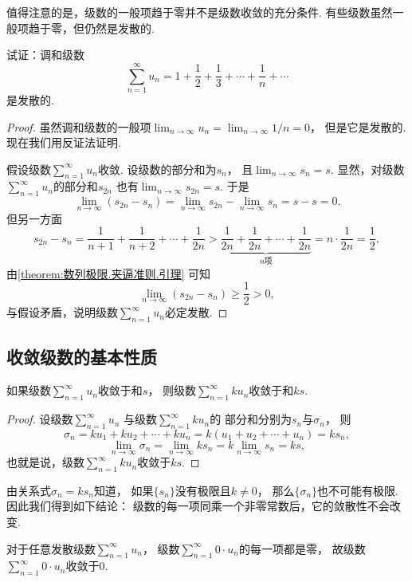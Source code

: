 值得注意的是，级数的一般项趋于零并不是级数收敛的充分条件.
有些级数虽然一般项趋于零，但仍然是发散的.
\begin{example}\label{example:无穷级数.调和级数的敛散性}
试证：调和级数\[
	\sum_{n=1}^\infty u_n
	= 1+\frac12+\frac13+\dotsb+\frac1n+\dotsb
\]是发散的.
\begin{proof}
虽然调和级数的一般项\(\lim_{n\to\infty} u_n
= \lim_{n\to\infty} 1/n
= 0\)，
但是它是发散的.
现在我们用反证法证明.

假设级数\(\sum_{n=1}^\infty u_n\)收敛.
设级数的部分和为\(s_n\)，
且\(\lim_{n\to\infty} s_n
= s\).
显然，对级数\(\sum_{n=1}^\infty u_n\)的部分和\(s_{2n}\)
也有\(\lim_{n\to\infty} s_{2n}
= s\).
于是\[
	\lim_{n\to\infty} (s_{2n}-s_n)
	= \lim_{n\to\infty} s_{2n} - \lim_{n\to\infty} s_n
	= s - s
	= 0.
\]
但另一方面\[
	s_{2n} - s_n
	= \frac{1}{n+1}+\frac{1}{n+2}+\dotsb+\frac{1}{2n}
	> \underbrace{\frac{1}{2n}+\frac{1}{2n}+\dotsb+\frac{1}{2n}}_{n\text{项}}
	= n \cdot \frac1{2n}
	= \frac12,
\]
由\cref{theorem:数列极限.夹逼准则.引理} 可知\[
	\lim_{n\to\infty} (s_{2n}-s_n)
	\geq \frac12
	> 0,
\]与假设矛盾，说明级数\(\sum_{n=1}^\infty u_n\)必定发散.
\end{proof}
\end{example}

\subsection{收敛级数的基本性质}
\begin{property}\label{theorem:无穷级数.收敛级数性质1}
如果级数\(\sum_{n=1}^\infty u_n\)收敛于和\(s\)，
则级数\(\sum_{n=1}^\infty k u_n\)收敛于和\(ks\).
\begin{proof}
设级数\(\sum_{n=1}^\infty u_n\)
与级数\(\sum_{n=1}^\infty k u_n\)的
部分和分别为\(s_n\)与\(\sigma_n\)，
则\[
	\sigma_n
	= k u_1 + k u_2 + \dotsb + k u_n
	= k(u_1 + u_2 + \dotsb + u_n) = k s_n,
\]\[
	\lim_{n\to\infty} \sigma_n
	= \lim_{n\to\infty} k s_n
	= k \lim_{n\to\infty} s_n = ks,
\]
也就是说，级数\(\sum_{n=1}^\infty k u_n\)收敛于\(ks\).
\end{proof}
\end{property}
\begin{remark}
由关系式\(\sigma_n = k s_n\)知道，
如果\(\{s_n\}\)没有极限且\(k\neq0\)，
那么\(\{\sigma_n\}\)也不可能有极限.
因此我们得到如下结论：
{\color{red}级数的每一项同乘一个非零常数后，它的敛散性不会改变.}
\end{remark}
\begin{remark}
对于任意发散级数\(\sum_{n=1}^\infty u_n\)，
级数\(\sum_{n=1}^\infty 0 \cdot u_n\)的每一项都是零，
故级数\(\sum_{n=1}^\infty 0 \cdot u_n\)收敛于\(0\).
\end{remark}

